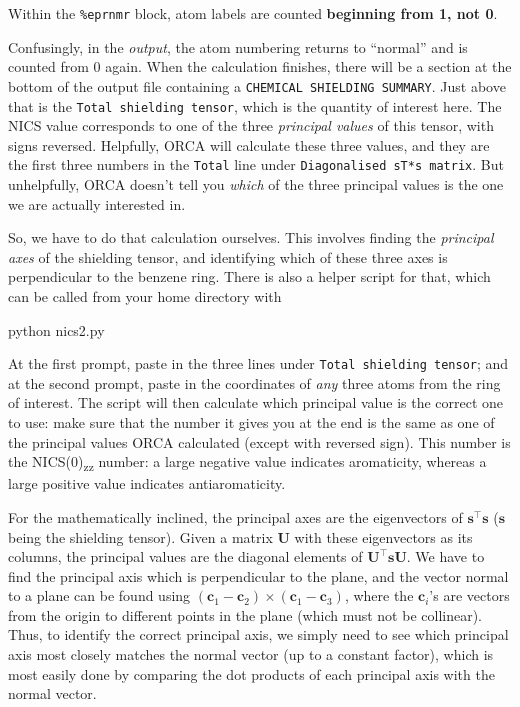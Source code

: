\documentclass[10pt]{article}
\begin{document}
\begin{warning}
Within the \texttt{\%eprnmr} block, atom labels are counted \textbf{beginning from 1, not 0}.
\end{warning}

Confusingly, in the \textit{output}, the atom numbering returns to ``normal'' and is counted from 0 again. When the calculation finishes, there will be a section at the bottom of the output file containing a \texttt{CHEMICAL SHIELDING SUMMARY}. Just above that is the \texttt{Total shielding tensor}, which is the quantity of interest here. The NICS value corresponds to one of the three \textit{principal values} of this tensor, with signs reversed. Helpfully, ORCA will calculate these three values, and they are the first three numbers in the \texttt{Total} line under \texttt{Diagonalised sT*s matrix}. But unhelpfully, ORCA doesn't tell you \textit{which} of the three principal values is the one we are actually interested in.

So, we have to do that calculation ourselves. This involves finding the \textit{principal axes} of the shielding tensor, and identifying which of these three axes is perpendicular to the benzene ring. There is also a helper script for that, which can be called from your home directory with

\begin{cmdline}
python nics2.py
\end{cmdline}

At the first prompt, paste in the three lines under \texttt{Total shielding tensor}; and at the second prompt, paste in the coordinates of \textit{any} three atoms from the ring of interest. The script will then calculate which principal value is the correct one to use: make sure that the number it gives you at the end is the same as one of the principal values ORCA calculated (except with reversed sign). This number is the NICS(0)\textsubscript{zz} number: a large negative value indicates aromaticity, whereas a large positive value indicates antiaromaticity.

For the mathematically inclined, the principal axes are the eigenvectors of \(\mathbf{s}^\intercal \mathbf{s}\) (\(\mathbf{s}\) being the shielding tensor). Given a matrix \(\mathbf{U}\) with these eigenvectors as its columns, the principal values are the diagonal elements of \(\mathbf{U^\intercal \mathbf{s} \mathbf{U}}\). We have to find the principal axis which is perpendicular to the plane, and the vector normal to a plane can be found using \((\mathbf{c}_1 - \mathbf{c}_2) \times (\mathbf{c}_1 - \mathbf{c}_3)\), where the \(\mathbf{c}_i\)'s are vectors from the origin to different points in the plane (which must not be collinear). Thus, to identify the correct principal axis, we simply need to see which principal axis most closely matches the normal vector (up to a constant factor), which is most easily done by comparing the dot products of each principal axis with the normal vector.

\printbibliography
\end{document}
